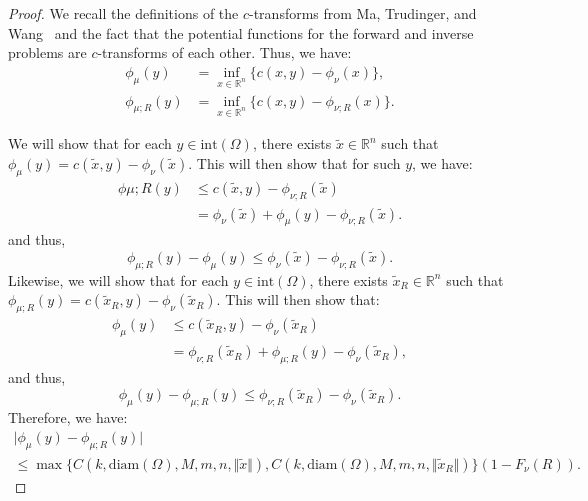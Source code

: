 \documentclass{amsart}
\theoremstyle{lemma}
\theoremstyle{remark}
\begin{document}
\begin{proof}
We recall the definitions of the $c$-transforms from Ma, Trudinger, and Wang~\cite{MTW} and the fact that the potential functions for the forward and inverse problems are $c$-transforms of each other. Thus, we have:
\begin{align}\label{eq:ctransform}
\phi_{\mu}(y) &= \inf_{x \in \mathbb{R}^n} \{ c(x,y) - \phi_{\nu}(x) \}, \\
\phi_{\mu; R}(y) &= \inf_{x \in \mathbb{R}^n} \{c(x,y) - \phi_{\nu;R}(x) \}.
\end{align}

We will show that for each $y \in \text{int}(\Omega)$, there exists $\tilde{x} \in \mathbb{R}^n$ such that $\phi_{\mu}(y) = c(\tilde{x}, y) - \phi_{\nu}(\tilde{x})$. This will then show that for such $y$, we have:
\begin{align}
\phi{\mu;R}(y) &\leq c(\tilde{x}, y) - \phi_{\nu;R}(\tilde{x}) \\
&= \phi_{\nu}(\tilde{x}) + \phi_{\mu}(y) - \phi_{\nu;R}(\tilde{x}).
\end{align}
and thus,
\begin{equation}
\phi_{\mu; R}(y) - \phi_{\mu}(y) \leq \phi_{\nu}(\tilde{x}) - \phi_{\nu;R}(\tilde{x}).
\end{equation}
Likewise, we will show that for each $y \in \text{int}(\Omega)$, there exists $\tilde{x}_{R} \in \mathbb{R}^n$ such that $\phi_{\mu;R}(y) = c(\tilde{x}_{R}, y) - \phi_{\nu}(\tilde{x}_{R})$. This will then show that:
\begin{align}
\phi_{\mu}(y) &\leq c(\tilde{x}_{R}, y) - \phi_{\nu}(\tilde{x}_{R}) \\
&= \phi_{\nu;R}(\tilde{x}_{R}) + \phi_{\mu;R}(y) - \phi_{\nu}(\tilde{x}_{R}),
\end{align}
and thus,
\begin{equation}
\phi_{\mu}(y) - \phi_{\mu;R}(y) \leq \phi_{\nu;R}(\tilde{x}_{R}) - \phi_{\nu}(\tilde{x}_{R}).
\end{equation}
Therefore, we have:
\begin{multline}\label{eq:bounds}
\vert \phi_{\mu}(y) - \phi_{\mu;R}(y) \vert \\
\leq \max \{ C(k, \text{diam}(\Omega), M, m, n, \Vert \tilde{x} \Vert), C(k, \text{diam}(\Omega), M, m, n, \Vert \tilde{x}_{R} \Vert) \} (1-F_{\nu}(R)).
\end{multline}


\end{proof}
\end{document}
